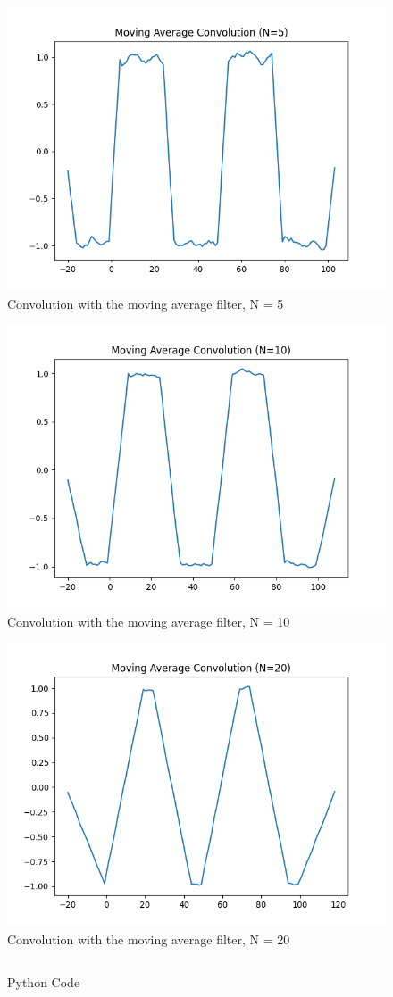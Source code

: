 \documentclass[10pt,a4paper, margin=1in]{article}
\begin{document}
\begin{enumerate}
\begin{enumerate}
\begin{figure}[H]
    \centering
    \caption{Convolution with the moving average filter, N = 5}
    \includegraphics[width=0.4\linewidth]{images/moving_average_5.png}
\end{figure}
\begin{figure}[H]
    \centering
    \caption{Convolution with the moving average filter, N = 10}
    \includegraphics[width=0.4\linewidth]{images/moving_average_10.png}
\end{figure}
\begin{figure}[H]
    \centering
    \caption{Convolution with the moving average filter, N = 20}
    \includegraphics[width=0.4\linewidth]{images/moving_average_20.png}
\end{figure}

\begin{figure}
    \caption{Python Code}
    \inputminted{python}{hw2.py}
\end{figure}
    \end{enumerate}

\end{enumerate}
\end{document}
